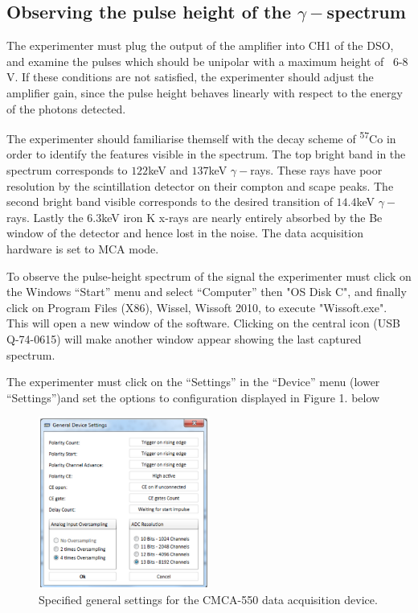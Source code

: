 \documentclass[a4paper, twocolumn]{article}
\begin{document}
\subsection{Observing the pulse height of the $\gamma-$spectrum}
The experimenter must plug the output of the amplifier into CH1 of the DSO, and examine the pulses which should be unipolar with a maximum height of ~6-8 V\cite{0}. If these conditions are not satisfied, the experimenter should adjust the amplifier gain, since the pulse height behaves linearly with respect to the energy of the photons detected\cite{0}. 

The experimenter should familiarise themself with the decay scheme of \textsuperscript{57}Co in order to identify the features visible in the spectrum. The top bright band in the spectrum corresponds to $122$keV and $137$keV $\gamma-$rays\cite{0}. These rays have poor resolution by the scintillation detector on their compton and scape peaks. The second bright band visible corresponds to the desired transition of $14.4$keV $\gamma-$rays. Lastly the $6.3$keV iron K x-rays are nearly entirely absorbed by the Be window of the detector and hence lost in the noise\cite{0}. The data acquisition hardware is set to MCA mode.

To observe the pulse-height spectrum of the signal the experimenter must click on the Windows “Start” menu and select “Computer” then "OS Disk C", and finally click on Program Files (X86), Wissel, Wissoft 2010, to execute "Wissoft.exe". This will open a new window of the software.
Clicking on the central icon (USB Q-74-0615) will make another window appear showing the last captured spectrum\cite{0}. 

The experimenter must click on the “Settings” in the “Device” menu (lower “Settings”)and set the options to configuration displayed in Figure 1. below

\begin{figure}[h]
\includegraphics[width=0.5\textwidth]{general_device_settings.png}    
\caption{Specified general settings for the CMCA-550 data acquisition device\cite{0}.
}
\end{figure}
\end{document}
